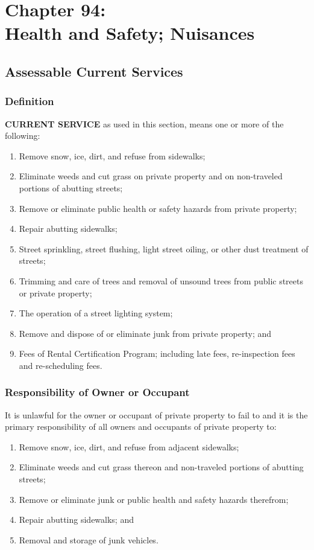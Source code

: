 \chapter*{Chapter 94: \\
	Health and Safety; Nuisances}
    \minitoc
    \pagebreak


\section{Assessable Current Services}
\subsection{Definition}
\textbf{CURRENT SERVICE} as used in this section, means one or more of the following: 
\begin{enumerate}[{\indent}1)]
    \item Remove snow, ice, dirt, and refuse from sidewalks; 
    \item Eliminate weeds and cut grass on private property and on non-traveled portions of abutting streets; 
    \item Remove or eliminate public health or safety hazards from private property; 
    \item Repair abutting sidewalks; 
    \item Street sprinkling, street flushing, light street oiling, or other dust treatment of streets; 
    \item Trimming and care of trees and removal of unsound trees from public streets or private property; 
    \item The operation of a street lighting system; 
    \item Remove and dispose of or eliminate junk from private property; and
    \item Fees of Rental Certification Program; including late fees, re-inspection fees and re-scheduling fees.
\end{enumerate}
\subsection{Responsibility of Owner or Occupant}
It is unlawful for the owner or occupant of private property to fail to and it is the primary responsibility of all owners and occupants of private property to: 
\begin{enumerate}[{\indent}1)]
    \item Remove snow, ice, dirt, and refuse from adjacent sidewalks; 
    \item Eliminate weeds and cut grass thereon and non-traveled portions of abutting streets; 
    \item Remove or eliminate junk or public health and safety hazards therefrom; 
    \item Repair abutting sidewalks; and
    \item Removal and storage of junk vehicles.
\end{enumerate}
